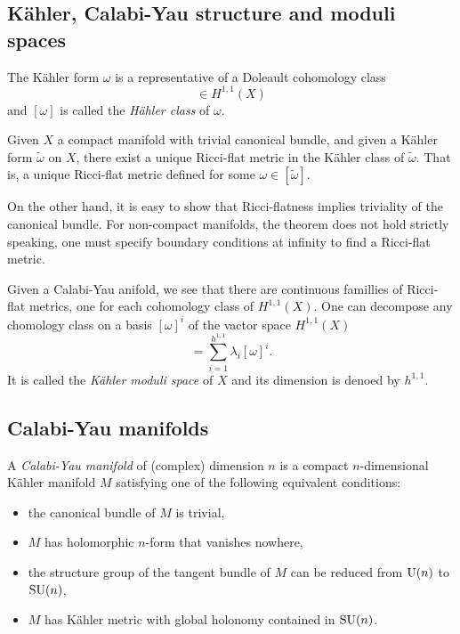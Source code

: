     \subsection{Kähler, Calabi-Yau structure and moduli spaces}

        The Kähler form $\omega$ is a representative of a Doleault cohomology class
        \begin{equation}
            [\omega]\in H^{1,1}(X)
        \end{equation}
        and $[\omega]$ is called the \emph{Hähler class} of $\omega$.
        \begin{theorem}
            Given $X$ a compact manifold with trivial canonical bundle, and given a Kähler form $\tilde{\omega}$ on $X$, there exist a unique Ricci-flat metric in the Kähler class of $\tilde{\omega}$. That is, a unique Ricci-flat metric defined for some $\omega\in[\tilde{\omega}]$.
        \end{theorem}
        On the other hand, it is easy to show that Ricci-flatness implies triviality of the canonical bundle. For non-compact manifolds, the theorem does not hold strictly speaking, one must specify boundary conditions at infinity to find a Ricci-flat metric.

        Given a Calabi-Yau anifold, we see that there are continuous famillies of Ricci-flat metrics, one for each cohomology class of $H^{1,1}(X)$. One can decompose any chomology class on a basis $[\omega]^i$ of the vactor space $H^{1,1}(X)$
        \begin{equation}
            [\omega]=\sum^{h^{1,1}}_{i=1}\lambda_i[\omega]^i.
        \end{equation}
        It is called the \emph{Kähler moduli space} of $X$ and its dimension is denoed by $h^{1,1}$.

    \subsection{Calabi-Yau manifolds}

        A \emph{Calabi-Yau manifold} of (complex) dimension $n$ is a compact $n$-dimensional Kähler manifold $M$ satisfying one of the following equivalent conditions:
        \begin{itemize}
            \item the canonical bundle of $M$ is trivial,
            \item $M$ has holomorphic $n$-form that vanishes nowhere,
            \item the structure group of the tangent bundle of $M$ can be reduced from $\text{U}(n)$ to $\text{SU}(n)$,
            \item $M$ has Kähler metric with global holonomy contained in $\text{SU}(n)$.
        \end{itemize}

